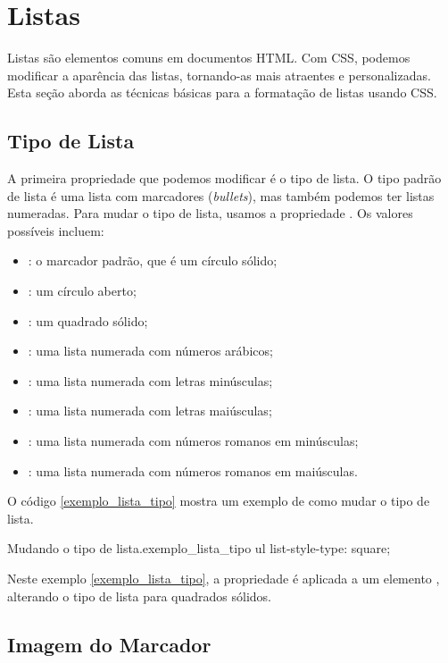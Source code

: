\section{Listas}

Listas são elementos comuns em documentos HTML. Com CSS, podemos modificar a aparência das listas, tornando-as mais atraentes e personalizadas. Esta seção aborda as técnicas básicas para a formatação de listas usando CSS.

\subsection{Tipo de Lista}

A primeira propriedade que podemos modificar é o tipo de lista. O tipo padrão de lista é uma lista com marcadores (\textit{bullets}), mas também podemos ter listas numeradas. Para mudar o tipo de lista, usamos a propriedade . Os valores possíveis incluem:

\begin{itemize}
\item {}: o marcador padrão, que é um círculo sólido;
\item {}: um círculo aberto;
\item {}: um quadrado sólido;
\item {}: uma lista numerada com números arábicos;
\item {}: uma lista numerada com letras minúsculas;
\item {}: uma lista numerada com letras maiúsculas;
\item {}: uma lista numerada com números romanos em minúsculas;
\item {}: uma lista numerada com números romanos em maiúsculas.
\end{itemize}

O código \ref{exemplo_lista_tipo} mostra um exemplo de como mudar o tipo de lista.

\begin{csscode}{Mudando o tipo de lista.}{exemplo_lista_tipo}
ul {
    list-style-type: square;
}
\end{csscode}

Neste exemplo \ref{exemplo_lista_tipo}, a propriedade  é aplicada a um elemento , alterando o tipo de lista para quadrados sólidos.

\subsection{Imagem do Marcador}

